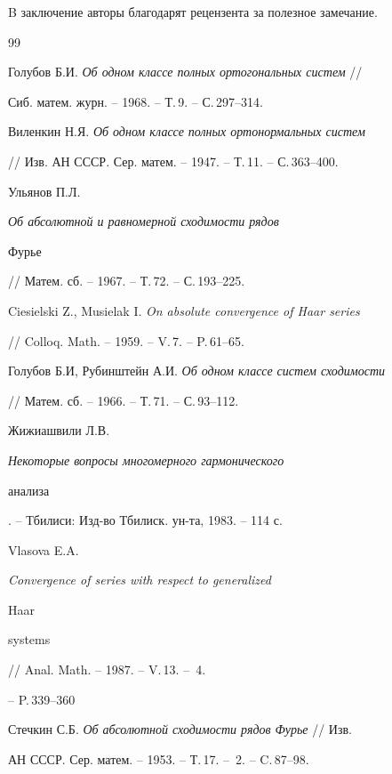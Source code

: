  


 


B заключение авторы благодарят рецензента за полезное замечание. 


 


\begin{thebibliography}{99} 


 




Голубов Б.И. {\it Об одном классе полных ортогональных систем} // 


Сиб. матем. журн. -- 1968. -- Т.\,9. -- С.\,297--314. 




Виленкин Н.Я. {\it Об одном классе полных ортонормальных систем} 


// Изв. АН СССР. Сер. матем. -- 1947. -- Т.\,11. -- С.\,363--400. 




Ульянов П.Л. {\it Об абсолютной и равномерной сходимости рядов 


Фурье} // Матем. сб. -- 1967. -- Т.\,72. -- С.\,193--225. 




Ciesielski Z., Musielak I. {\it On absolute convergence of Haar series} 


// Colloq. Math. -- 1959. -- V.\,7. -- P.\,61--65. 




Голубов Б.И, Рубинштейн А.И. {\it Об одном классе систем сходимости} 


// Матем. сб. -- 1966. -- Т.\,71. -- С.\,93--112. 




Жижиашвили Л.В. {\it Некоторые вопросы многомерного гармонического 


анализа}. -- Тбилиси: Изд-во Тбилиск. ун-та, 1983. -- 114 с. 




Vlasova E.A. {\it Convergence of series with respect to generalized 


Haar 


systems} // Anal. Math. -- 1987. -- V.\,13. -- \No\,4. 


-- P.\,339--360 




Стечкин С.Б. {\it Об абсолютной сходимости рядов Фурье} // Изв. 


АН СССР. Сер. матем. -- 1953. -- Т.\,17. -- \No\,2. -- C.\,87--98. 



\end{thebibliography}
